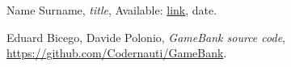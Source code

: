 %
%
%
\begin{thebibliography}{1}

  Name Surname,
  \emph{title},
  Available: \url{link},
  date.
  
  Eduard Bicego, Davide Polonio,
  \emph{GameBank source code},
  \url{https://github.com/Codernauti/GameBank}.

\end{thebibliography}
